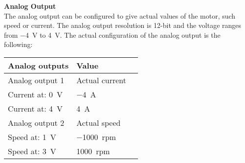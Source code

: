 \textbf{Analog Output}\\
The analog output can be configured to give actual values of the motor, such speed or current. The analog output resolution is 12-bit and the voltage ranges from \SI{-4}{V} to \SI{4}{V}. The actual configuration of the analog output is the following:
\begin{table}[H]
	\centering
	\begin{tabular}{|l|l|p{4.3cm}|}
		\hline%
		\textbf{Analog outputs}       &  \textbf{Value}         \\
		\hline%
		Analog output 1                                & Actual current           \\
		\hline%
		Current at: \SI{0}{V}							  & \SI{-4}{A}              \\
		\hline%
		Current at: \SI{4}{V}							  & \SI{4}{A}              \\
		\hline%
		Analog output 2							  & Actual speed              \\
		\hline%
		Speed at: \SI{1}{V}							  & \SI{-1000}{rpm}               \\
		\hline%
		Speed at: \SI{3}{V}							  & \SI{1000}{rpm}               \\
		\hline%
	\end{tabular}
\end{table}

